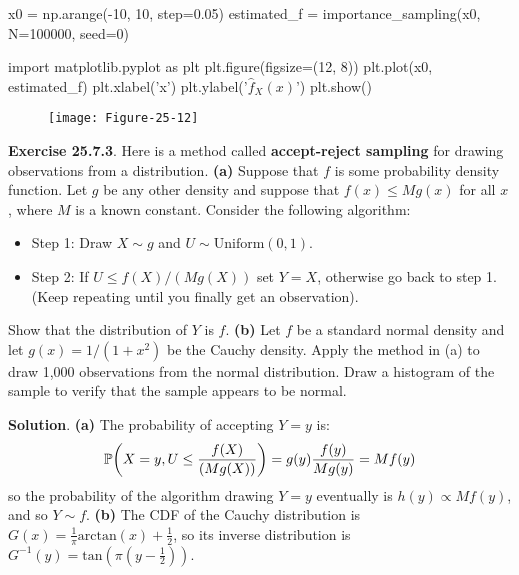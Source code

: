 \begin{python}
x0 = np.arange(-10, 10, step=0.05)
estimated_f = importance_sampling(x0, N=100000, seed=0)
\end{python}

\begin{python}
import matplotlib.pyplot as plt
plt.figure(figsize=(12, 8))
plt.plot(x0, estimated_f)
plt.xlabel('x')
plt.ylabel('$\hat{f}_X(x)$')
plt.show()
\end{python}

\begin{figure}[H]
\centering
\texttt{[image: Figure-25-12]}
\end{figure}


\textbf{Exercise 25.7.3}. Here is a method called \textbf{accept-reject
sampling} for drawing observations from a distribution.
\textbf{(a)} Suppose that \(f\) is some probability density function.
Let \(g\) be any other density and suppose that \(f(x) \leq M g(x)\) for
all \(x\), where \(M\) is a known constant. Consider the following
algorithm:
\begin{itemize}[tightlist]
\item
  Step 1: Draw \(X \sim g\) and \(U \sim \text{Uniform}(0, 1)\).
\item
  Step 2: If \(U \leq f(X) / (M g(X))\) set \(Y = X\), otherwise go back
  to step 1. (Keep repeating until you finally get an observation).
\end{itemize}
Show that the distribution of \(Y\) is \(f\).
\textbf{(b)} Let \(f\) be a standard normal density and let
\(g(x) = 1 / (1 + x^{2})\) be the Cauchy density. Apply the method in (a)
to draw 1,000 observations from the normal distribution. Draw a
histogram of the sample to verify that the sample appears to be normal.

\textbf{Solution}.
\textbf{(a)} The probability of accepting \(Y = y\) is:
\[
\PROB\left(X = y, U \leq \frac{f(X)}{(M g(X))} \right) = g(y) \frac{f(y)}{M g(y)} = M f(y)
\]
so the probability of the algorithm drawing \(Y = y\) eventually is
\(h(y) \propto M f(y)\), and so \(Y \sim f\).
\textbf{(b)}
The CDF of the Cauchy distribution is
\(G(x) = \frac{1}{\pi} \text{arctan}\left( x \right) + \frac{1}{2}\), so
its inverse distribution is
\(G^{-1}(y) = \text{tan} \left( \pi \left( y - \frac{1}{2} \right) \right)\).

